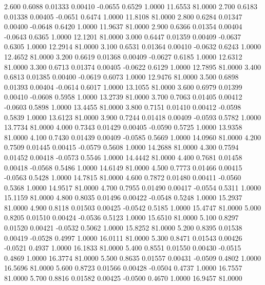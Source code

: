    2.600   0.6088   0.01333   0.00410  -0.0655   0.6529   1.0000  11.6553  81.0000
   2.700   0.6183   0.01338   0.00405  -0.0651   0.6474   1.0000  11.8108  81.0000
   2.800   0.6284   0.01347   0.00400  -0.0648   0.6420   1.0000  11.9637  81.0000
   2.900   0.6366   0.01354   0.00404  -0.0643   0.6365   1.0000  12.1201  81.0000
   3.000   0.6447   0.01359   0.00409  -0.0637   0.6305   1.0000  12.2914  81.0000
   3.100   0.6531   0.01364   0.00410  -0.0632   0.6243   1.0000  12.4652  81.0000
   3.200   0.6619   0.01368   0.00409  -0.0627   0.6185   1.0000  12.6312  81.0000
   3.300   0.6713   0.01374   0.00405  -0.0622   0.6129   1.0000  12.7895  81.0000
   3.400   0.6813   0.01385   0.00400  -0.0619   0.6073   1.0000  12.9476  81.0000
   3.500   0.6898   0.01393   0.00404  -0.0614   0.6017   1.0000  13.1055  81.0000
   3.600   0.6979   0.01399   0.00410  -0.0608   0.5958   1.0000  13.2739  81.0000
   3.700   0.7063   0.01405   0.00412  -0.0603   0.5898   1.0000  13.4455  81.0000
   3.800   0.7151   0.01410   0.00412  -0.0598   0.5839   1.0000  13.6123  81.0000
   3.900   0.7244   0.01418   0.00409  -0.0593   0.5782   1.0000  13.7734  81.0000
   4.000   0.7343   0.01429   0.00405  -0.0590   0.5725   1.0000  13.9358  81.0000
   4.100   0.7430   0.01439   0.00409  -0.0585   0.5669   1.0000  14.0960  81.0000
   4.200   0.7509   0.01445   0.00415  -0.0579   0.5608   1.0000  14.2688  81.0000
   4.300   0.7594   0.01452   0.00418  -0.0573   0.5546   1.0000  14.4442  81.0000
   4.400   0.7681   0.01458   0.00418  -0.0568   0.5486   1.0000  14.6149  81.0000
   4.500   0.7773   0.01466   0.00415  -0.0563   0.5428   1.0000  14.7815  81.0000
   4.600   0.7872   0.01480   0.00411  -0.0560   0.5368   1.0000  14.9517  81.0000
   4.700   0.7955   0.01490   0.00417  -0.0554   0.5311   1.0000  15.1159  81.0000
   4.800   0.8035   0.01496   0.00422  -0.0548   0.5248   1.0000  15.2937  81.0000
   4.900   0.8118   0.01503   0.00425  -0.0542   0.5185   1.0000  15.4747  81.0000
   5.000   0.8205   0.01510   0.00424  -0.0536   0.5123   1.0000  15.6510  81.0000
   5.100   0.8297   0.01520   0.00421  -0.0532   0.5062   1.0000  15.8252  81.0000
   5.200   0.8395   0.01538   0.00419  -0.0528   0.4997   1.0000  16.0111  81.0000
   5.300   0.8471   0.01543   0.00426  -0.0521   0.4937   1.0000  16.1833  81.0000
   5.400   0.8551   0.01550   0.00430  -0.0515   0.4869   1.0000  16.3774  81.0000
   5.500   0.8635   0.01557   0.00431  -0.0509   0.4802   1.0000  16.5696  81.0000
   5.600   0.8723   0.01566   0.00428  -0.0504   0.4737   1.0000  16.7557  81.0000
   5.700   0.8816   0.01582   0.00425  -0.0500   0.4670   1.0000  16.9457  81.0000
